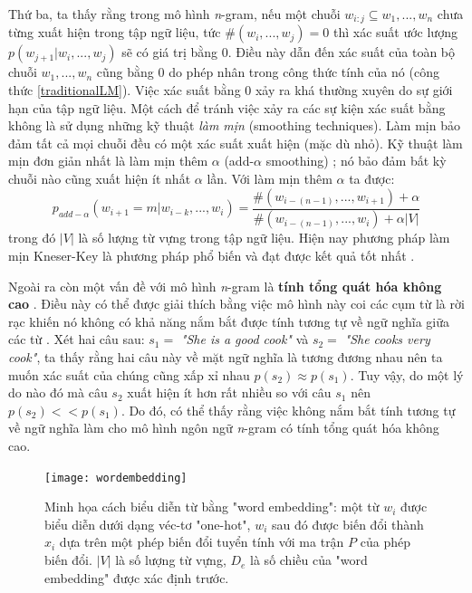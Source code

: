 Thứ ba, ta thấy rằng trong mô hình \textit{n}-gram, nếu một chuỗi $w_{i:j} \subseteq w_1,...,w_n$ chưa từng xuất hiện trong tập ngữ liệu, tức $\# \left(w_i,...,w_j \right) = 0$ thì xác suất ước lượng $p(w_{j+1}|w_i,...,w_j)$ sẽ có giá trị bằng 0. Điều này dẫn đến xác suất của toàn bộ chuỗi $w_1,...,w_n$ cũng bằng 0 do phép nhân trong công thức tính của nó (công thức \ref{traditionalLM}). Việc xác suất bằng 0 xảy ra khá thường xuyên do sự giới hạn của tập ngữ liệu. Một cách để tránh việc xảy ra các sự kiện xác suất bằng không là sử dụng những kỹ thuật \textit{làm mịn} (smoothing techniques). Làm mịn bảo đảm tất cả mọi chuỗi đều có một xác suất xuất hiện (mặc dù nhỏ). Kỹ thuật làm mịn đơn giản nhất là làm mịn thêm $\alpha$ (add-$\alpha$ smoothing) \cite{goodman2001}; nó bảo đảm bất kỳ chuỗi nào cũng xuất hiện ít nhất $\alpha$ lần. Với làm mịn thêm $\alpha$ ta được:
\begin{equation} \label{ngramLMWithSmoothing}
	p_{add-\alpha} \left(w_{i+1}=m|w_{i-k},...,w_{i} \right) = \frac{\# \left(w_{i-(n-1)},...,w_{i+1} \right) + \alpha}{\# \left(w_{i-(n-1)},...,w_{i} \right) + \alpha \left|V \right| }
\end{equation}
trong đó $\left|V \right|$ là số lượng từ vựng trong tập ngữ liệu. Hiện nay phương pháp làm mịn Kneser-Key là phương pháp phổ biến và đạt được kết quả tốt nhất \cite{jurafsky2000}.

Ngoài ra còn một vấn đề với mô hình \textit{n}-gram là \textbf{tính tổng quát hóa không cao} \cite{bengioLM2003}. Điều này có thể được giải thích bằng việc mô hình này coi các cụm từ là rời rạc khiến nó không có khả năng nắm bắt được tính tương tự về ngữ nghĩa giữa các từ \cite{bengioLM2003}. Xét hai câu sau: $s_1 =$ \textit{"She is a good cook"} và $s_2 =$ \textit{"She cooks very cook"}, ta thấy rằng hai câu này về mặt ngữ nghĩa là tương đương nhau nên ta muốn xác suất của chúng cũng xấp xỉ nhau $p(s_2) \approx p(s_1)$. Tuy vậy, do một lý do nào đó mà câu $s_2$ xuất hiện ít hơn rất nhiều so với câu $s_1$ nên $p(s_2) << p(s_1)$. Do đó, có thể thấy rằng việc không nắm bắt tính tương tự về ngữ nghĩa làm cho mô hình ngôn ngữ \textit{n}-gram có tính tổng quát hóa không cao.

\begin{figure}
	\centering
	\texttt{[image: wordembedding]}
	\caption[Minh họa cách biểu diễn từ bằng "word embedding"]{Minh họa cách biểu diễn từ bằng "word embedding": một từ $w_i$ được biểu diễn dưới dạng véc-tơ "one-hot", $w_i$ sau đó được biến đổi thành $x_i$ dựa trên một phép biến đổi tuyển tính với ma trận $P$ của phép biến đổi. $|V|$ là số lượng từ vựng, $D_e$ là số chiều của "word embedding" được xác định trước.}
	\label{fig_wordembedding}
\end{figure}

